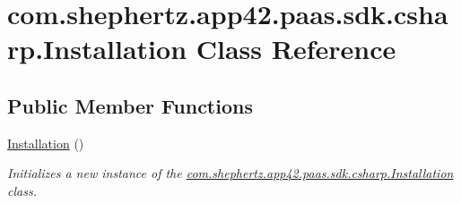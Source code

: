 \hypertarget{classcom_1_1shephertz_1_1app42_1_1paas_1_1sdk_1_1csharp_1_1_installation}{\section{com.\+shephertz.\+app42.\+paas.\+sdk.\+csharp.\+Installation Class Reference}
\label{classcom_1_1shephertz_1_1app42_1_1paas_1_1sdk_1_1csharp_1_1_installation}
}
\subsection*{Public Member Functions}
\begin{DoxyCompactItemize}
\item 
\hyperlink{classcom_1_1shephertz_1_1app42_1_1paas_1_1sdk_1_1csharp_1_1_installation_aa9f927296939834dcb6dc2f2ae376585}{Installation} ()
\begin{DoxyCompactList}\small\item\em Initializes a new instance of the \hyperlink{classcom_1_1shephertz_1_1app42_1_1paas_1_1sdk_1_1csharp_1_1_installation}{com.\+shephertz.\+app42.\+paas.\+sdk.\+csharp.\+Installation} class. \end{DoxyCompactList}\end{DoxyCompactItemize}
